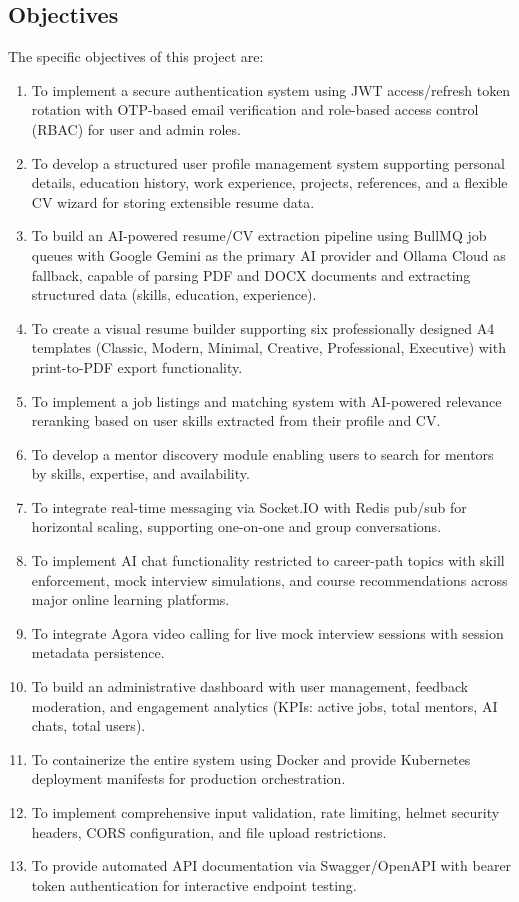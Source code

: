 \documentclass[12pt,a4paper]{report}
\begin{document}
\subsection{Objectives}
The specific objectives of this project are:

\begin{enumerate}[label=\textbf{OBJ-\arabic*}:, leftmargin=*]
    \item To implement a secure authentication system using JWT access/refresh token rotation with OTP-based email verification and role-based access control (RBAC) for user and admin roles.
    \item To develop a structured user profile management system supporting personal details, education history, work experience, projects, references, and a flexible CV wizard for storing extensible resume data.
    \item To build an AI-powered resume/CV extraction pipeline using BullMQ job queues with Google Gemini as the primary AI provider and Ollama Cloud as fallback, capable of parsing PDF and DOCX documents and extracting structured data (skills, education, experience).
    \item To create a visual resume builder supporting six professionally designed A4 templates (Classic, Modern, Minimal, Creative, Professional, Executive) with print-to-PDF export functionality.
    \item To implement a job listings and matching system with AI-powered relevance reranking based on user skills extracted from their profile and CV.
    \item To develop a mentor discovery module enabling users to search for mentors by skills, expertise, and availability.
    \item To integrate real-time messaging via Socket.IO with Redis pub/sub for horizontal scaling, supporting one-on-one and group conversations.
    \item To implement AI chat functionality restricted to career-path topics with skill enforcement, mock interview simulations, and course recommendations across major online learning platforms.
    \item To integrate Agora video calling for live mock interview sessions with session metadata persistence.
    \item To build an administrative dashboard with user management, feedback moderation, and engagement analytics (KPIs: active jobs, total mentors, AI chats, total users).
    \item To containerize the entire system using Docker and provide Kubernetes deployment manifests for production orchestration.
    \item To implement comprehensive input validation, rate limiting, helmet security headers, CORS configuration, and file upload restrictions.
    \item To provide automated API documentation via Swagger/OpenAPI with bearer token authentication for interactive endpoint testing.
\end{enumerate}
\end{document}
